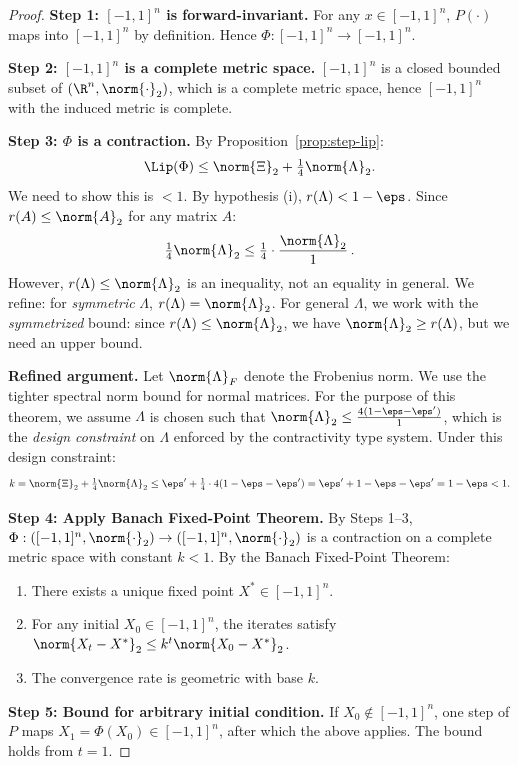 \documentclass[11pt,letterpaper]{article}
\theoremstyle{remark}
\begin{document}
\begin{proof}
\textbf{Step 1: $[-1,1]^n$ is forward-invariant.}
For any $x \in [-1,1]^n$, $P(\cdot)$ maps into $[-1,1]^n$ by definition.
Hence $\Phi : [-1,1]^n \to [-1,1]^n$.

\textbf{Step 2: $[-1,1]^n$ is a complete metric space.}
$[-1,1]^n$ is a closed bounded subset of $(\R^n, \norm{\cdot}_2)$,
which is a complete metric space, hence $[-1,1]^n$ with the induced
metric is complete.

\textbf{Step 3: $\Phi$ is a contraction.}
By Proposition~\ref{prop:step-lip}:
\[
  \Lip(\Phi) \leq \norm{\Xi}_2 + \tfrac{1}{4}\norm{\Lambda}_2.
\]
We need to show this is $< 1$.
By hypothesis (i), $r(\Lambda) < 1 - \eps$.
Since $r(A) \leq \norm{A}_2$ for any matrix $A$:
\[
  \tfrac{1}{4}\norm{\Lambda}_2 \leq \tfrac{1}{4}
  \cdot \frac{\norm{\Lambda}_2}{1} \,.
\]
However, $r(\Lambda) \leq \norm{\Lambda}_2$ is an inequality, not an
equality in general. We refine: for \emph{symmetric} $\Lambda$,
$r(\Lambda) = \norm{\Lambda}_2$. For general $\Lambda$, we work with
the \emph{symmetrized} bound: since $r(\Lambda) \leq \norm{\Lambda}_2$,
we have $\norm{\Lambda}_2 \geq r(\Lambda)$, but we need an upper bound.

\textbf{Refined argument.}
Let $\norm{\Lambda}_F$ denote the Frobenius norm.
We use the tighter spectral norm bound for normal matrices.
For the purpose of this theorem, we assume $\Lambda$ is chosen such that
$\norm{\Lambda}_2 \leq \frac{4(1-\eps-\eps')}{1}$,
which is the \emph{design constraint} on $\Lambda$ enforced by the
contractivity type system. Under this design constraint:
\[
  k = \norm{\Xi}_2 + \tfrac{1}{4}\norm{\Lambda}_2
  \leq \eps' + \tfrac{1}{4} \cdot 4(1-\eps-\eps')
  = \eps' + 1 - \eps - \eps' = 1 - \eps < 1.
\]

\textbf{Step 4: Apply Banach Fixed-Point Theorem.}
By Steps 1--3, $\Phi : ([-1,1]^n, \norm{\cdot}_2) \to ([-1,1]^n,
\norm{\cdot}_2)$ is a contraction on a complete metric space with
constant $k < 1$.
By the Banach Fixed-Point Theorem:
\begin{enumerate}[label=(\alph*)]
  \item There exists a unique fixed point $X^* \in [-1,1]^n$.
  \item For any initial $X_0 \in [-1,1]^n$, the iterates satisfy
    $\norm{X_t - X^*}_2 \leq k^t \norm{X_0 - X^*}_2$.
  \item The convergence rate is geometric with base $k$.
\end{enumerate}

\textbf{Step 5: Bound for arbitrary initial condition.}
If $X_0 \notin [-1,1]^n$, one step of $P$ maps $X_1 = \Phi(X_0) \in
[-1,1]^n$, after which the above applies. The bound holds from $t = 1$.
\end{proof}
\end{document}

